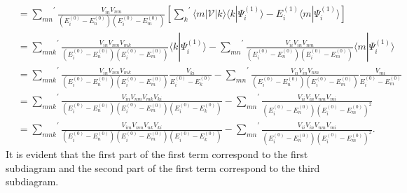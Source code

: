 \documentclass[a4paper]{book}
\newcounter{solution}[chapter]
\begin{document}
\begin{solution}
\begin{align*}
		&= { \sum_{mn} }^\prime \frac{ V_{in} V_{nm} }{ (E^{(0)}_i - E^{(0)}_n) (E^{(0)}_i - E^{(0)}_m) } \left[ { \sum_k }^\prime \langle m | \mathscr{V} | k \rangle \langle k | \Psi^{(1)}_i \rangle - E^{(1)}_i \langle m | \Psi^{(1)}_i \rangle \right] \\
		&= { \sum_{mnk} }^\prime \frac{ V_{in} V_{nm} V_{mk} }{ (E^{(0)}_i - E^{(0)}_n) (E^{(0)}_i - E^{(0)}_m) } \langle k | \Psi^{(1)}_i \rangle - { \sum_{mn} }^\prime \frac{ V_{ii} V_{in} V_{nm} }{ (E^{(0)}_i - E^{(0)}_n) (E^{(0)}_i - E^{(0)}_m) } \langle m | \Psi^{(1)}_i \rangle \\
		&= { \sum_{mnk} }^\prime \frac{ V_{in} V_{nm} V_{mk} }{ (E^{(0)}_i - E^{(0)}_n) (E^{(0)}_i - E^{(0)}_m) } \frac{ V_{ki} }{ E^{(0)}_i - E^{(0)}_k } - { \sum_{mn} }^\prime \frac{ V_{ii} V_{in} V_{nm} }{ (E^{(0)}_i - E^{(0)}_n) (E^{(0)}_i - E^{(0)}_m) } \frac{ V_{mi} }{ E^{(0)}_i - E^{(0)}_m } \\
		&= { \sum_{mnk} }^\prime \frac{ V_{in} V_{nm} V_{mk} V_{ki} }{ (E^{(0)}_i - E^{(0)}_n) (E^{(0)}_i - E^{(0)}_m) (E^{(0)}_i - E^{(0)}_k) } - { \sum_{mn} }^\prime \frac{ V_{ii} V_{in} V_{nm} V_{mi} }{ (E^{(0)}_i - E^{(0)}_n) (E^{(0)}_i - E^{(0)}_m)^2 } \\
		&= { \sum_{mnk} }^\prime \frac{ V_{im} V_{mn} V_{nk} V_{ki} }{ (E^{(0)}_i - E^{(0)}_n) (E^{(0)}_i - E^{(0)}_m) (E^{(0)}_i - E^{(0)}_k) } - { \sum_{mn} }^\prime \frac{ V_{ii} V_{in} V_{nm} V_{mi} }{ (E^{(0)}_i - E^{(0)}_n) (E^{(0)}_i - E^{(0)}_m)^2 }.
	\end{align*}
	It is evident that the first part of the first term correspond to the first subdiagram and the second part of the first term correspond to the third subdiagram.
	

\end{solution}
\end{document}
